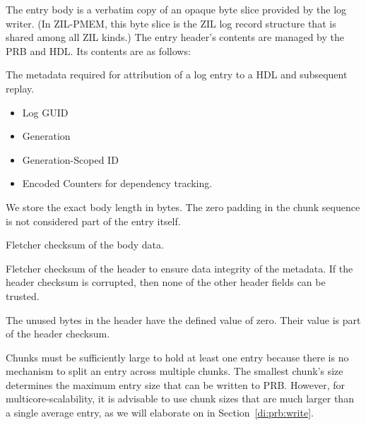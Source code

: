 \documentclass[12pt,a4paper,twoside]{book}
\begin{document}
{The entry body is a verbatim copy of an opaque byte slice provided by the log writer.
(In ZIL-PMEM, this byte slice is the ZIL log record structure that is shared among all ZIL kinds.)
The entry header's contents are managed by the PRB and HDL.
Its contents are as follows:
\begin{description}[noitemsep,leftmargin=1.5cm,labelindent=1cm]
    \item[HDL-scoped metadata] The metadata required for attribution of a log entry to a HDL and subsequent replay.
    \begin{itemize}
        \item Log GUID
        \item Generation
        \item Generation-Scoped ID
        \item Encoded Counters for dependency tracking.
    \end{itemize}
    \item[Body Length] We store the exact body length in bytes.
    The zero padding in the chunk sequence is not considered part of the entry itself.
    \item[Body Checksum] Fletcher checksum of the body data.
    \item[Header Checksum] Fletcher checksum of the header to ensure data integrity of the metadata.
    If the header checksum is corrupted, then none of the other header fields can be trusted.
    \item[Zero Padding] The unused bytes in the header have the defined value of zero.
    Their value is part of the header checksum.
\end{description}

Chunks must be sufficiently large to hold at least one entry because there is no mechanism to split an entry across multiple chunks.
The smallest chunk's size determines the maximum entry size that can be written to PRB.
However, for multicore-scalability, it is advisable to use chunk sizes that are much larger than a single average entry, as we will elaborate on in Section~\ref{di:prb:write}.

}
\end{document}
